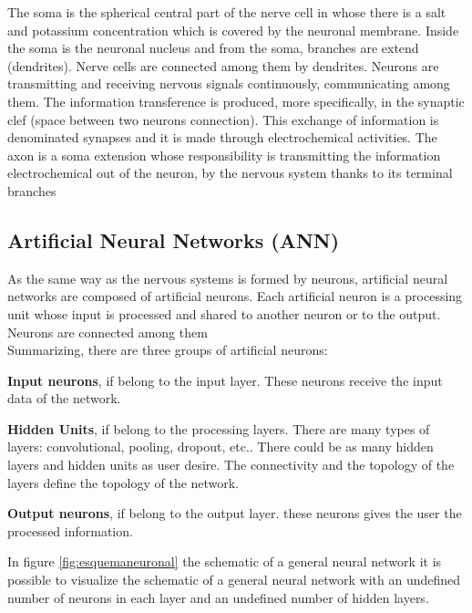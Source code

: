 The soma is the spherical central part of the nerve cell in whose there is a salt and potassium concentration which is covered by the neuronal membrane. Inside the soma is the neuronal nucleus and from the soma, branches are extend (dendrites). Nerve cells are connected among them by dendrites. Neurons are transmitting and receiving nervous signals continuously, communicating among them. The information transference is produced, more specifically, in the synaptic clef (space between two neurons connection). This exchange of information is denominated synapses and it is made through electrochemical activities. The axon is a soma extension whose responsibility is transmitting the information electrochemical out of the neuron, by the nervous system thanks to its terminal branches \cite{BINN, neuroscience}\\

\subsection{Artificial Neural Networks (ANN)}
As the same way as the nervous systems is formed by neurons, artificial neural networks are composed of artificial neurons. Each artificial neuron is a processing unit whose input is processed and shared to another neuron or to the output. Neurons are connected among them \cite{BINN}\\

Summarizing, there are three groups of artificial neurons:
\begin{description}[itemsep=2pt,topsep=8pt,parsep=0pt,partopsep=20pt]
\item \textbf{Input neurons}, if belong to the input layer. These neurons receive the input data of the network.
\item \textbf{Hidden Units}, if belong to the processing layers. There are many types of layers: convolutional, pooling, dropout, etc.. There could be as many hidden layers and hidden units as user desire. The connectivity and the topology of the layers define the topology of the network.
\item \textbf{Output neurons}, if belong to the output layer. these neurons gives the user the processed information.
\end{description}

In figure \ref{fig:esquemaneuronal} the schematic of a general neural network it is possible to visualize the schematic of a general neural network with an undefined number of neurons in each layer and an undefined number of hidden layers.\\

